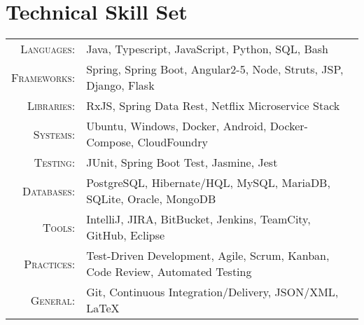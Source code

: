 \section{Technical Skill Set}\label{sec:technical-skill-set}
\begin{tabular}{r|p{11cm}}
    \textsc{Languages}: & Java, Typescript, JavaScript, Python, SQL, Bash \\
    \textsc{Frameworks}: & Spring, Spring Boot, Angular2-5, Node, Struts, JSP, Django, Flask \\
    \textsc{Libraries}: & RxJS, Spring Data Rest, Netflix Microservice Stack \\
    \textsc{Systems}: & Ubuntu, Windows, Docker, Android, Docker-Compose, CloudFoundry \\
    \textsc{Testing}: & JUnit, Spring Boot Test, Jasmine, Jest \\
    \textsc{Databases}: & PostgreSQL, Hibernate/HQL, MySQL, MariaDB, SQLite, Oracle, MongoDB \\
    \textsc{Tools}: & IntelliJ, JIRA, BitBucket, Jenkins, TeamCity, GitHub, Eclipse \\
    \textsc{Practices}: & Test-Driven Development, Agile, Scrum, Kanban, Code Review, Automated Testing \\
    \textsc{General}: & Git, Continuous Integration/Delivery, JSON/XML, LaTeX  \\
\end{tabular}
